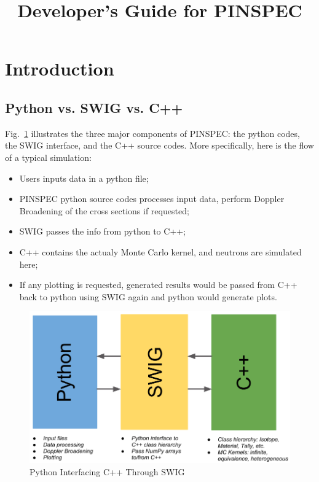 \documentclass[titlepage]{article}
\begin{document}
\title{Developer's Guide for PINSPEC}
\maketitle

\section{Introduction}
\subsection{Python vs. SWIG vs. C++}
Fig.~\ref{high-level} illustrates the three major components of PINSPEC: the python codes, the SWIG interface, and the C++ source codes. More specifically, here is the flow of a typical simulation:
\begin{itemize}
\item Users inputs data in a python file;
\item PINSPEC python source codes processes input data, perform Doppler Broadening of the cross sections if requested;
\item SWIG passes the info from python to C++;
\item C++ contains the actualy Monte Carlo kernel, and neutrons are simulated here;
\item If any plotting is requested, generated results would be passed from C++ back to python using SWIG again and python would generate plots. 
\end{itemize}

\begin{figure}[h]
  \centering
  \includegraphics[width=5in]{images/high-level.png}
  \caption{Python Interfacing C++ Through SWIG} \label{high-level}
\end{figure}
\end{document}
